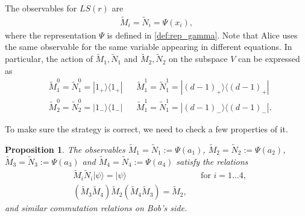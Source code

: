 \documentclass[11pt,letterpaper]{article}
\newcommand{\ket}[1]{|#1\rangle}
\newcommand{\ketbra}[2]{|#1\rangle\langle#2|}
\newcommand{\1}{\mathbb{1}}
\newcommand{\LS}{LS}
\newcommand{\tM}{\tilde{M}}
\newcommand{\tN}{\tilde{N}}
\newtheorem{proposition}[theorem]{Proposition}
\theoremstyle{definition}
\begin{document}
The observables for $\LS(r)$ are
\begin{align}
	\tM_i = \tN_i = \Psi(x_i),
\end{align}
where the representation $\Psi$ is defined in \cref{def:rep_gamma}.
Note that Alice uses the same observable for the same variable appearing in different equations.
In particular, the action of $\tM_1, \tN_1$ and $\tM_2, \tN_2$ on the subspace $V$ can be expressed as
\begin{align*}
	&\tM_1^0 = \tN_1^0 =  \ketbra{1_+}{1_+} && \tM_1^1 = \tN_1^1 =  \ketbra{(d-1)_+}{(d-1)_+}\\
	&\tM_2^0 = \tN_2^0 =  \ketbra{1_-}{1_-} && \tM_1^1 = \tN_1^1 =  \ketbra{(d-1)_-}{(d-1)_-}.
\end{align*}

To make sure the strategy is correct, we need to check a few properties of it.
\begin{proposition}
The observables $\tM_1 = \tN_1 :=\Psi(a_1)$, $\tM_2 = \tN_2 := \Psi(a_2)$, $\tM_3 = \tN_3 := \Psi(a_3)$
and $\tM_4 = \tN_4 := \Psi(a_4)$ satisfy the relations
\begin{align}
	\label{eq:mn_preserve} &\tM_i \tN_i \ket{\psi} = \ket{\psi} && \text{for } i = 1 \dots 4,\\
	\label{eq:o2_comm} &(\tM_3\tM_4)\tM_2(\tM_4\tM_3) = \tM_2,
\end{align}
and similar commutation relations on Bob's side.
\end{proposition}
\end{document}
